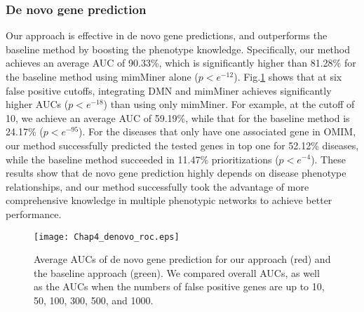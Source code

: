 \subsubsection{De novo gene prediction}
Our approach is effective in de novo gene predictions,
and outperforms the baseline method by boosting the phenotype knowledge.
Specifically, our method achieves an average AUC of 90.33\%, which is
significantly higher than 81.28\% for the baseline method
using mimMiner alone ($p < e^{-12}$). Fig.\ref{denovo_roc} shows
that at six false positive cutoffs, integrating DMN and mimMiner
achieves significantly higher AUCs ($p<e^{-18}$)
than using only mimMiner.
For example, at the cutoff of 10, we achieve an average
AUC of 59.19\%, while that for the baseline method is 24.17\% ($p<e^{-95}$).
For the diseases that only have one associated gene in OMIM,
our method successfully predicted the tested genes in top one for 52.12\%
diseases, while the baseline method succeeded in 11.47\% prioritizations ($p<e^{-4}$).
These results show that de novo gene prediction highly
depends on disease phenotype relationships,
and our method successfully
took the advantage of more comprehensive knowledge
in multiple phenotypic networks to achieve better performance.

\begin{figure}[!tpb]
\vspace{-.5cm}
\centerline{\texttt{[image: Chap4\_denovo\_roc.eps]}}
\vspace{-.5cm}
\caption{Average AUCs of de novo gene prediction for our approach (red) and the baseline approach (green). We compared overall AUCs, as well as the AUCs when the numbers of false positive genes are up to 10, 50, 100, 300, 500, and 1000.}
\label{denovo_roc}
\end{figure}



